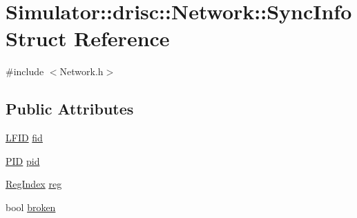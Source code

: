 \hypertarget{struct_simulator_1_1drisc_1_1_network_1_1_sync_info}{\section{Simulator\+:\+:drisc\+:\+:Network\+:\+:Sync\+Info Struct Reference}
\label{struct_simulator_1_1drisc_1_1_network_1_1_sync_info}
}


{\ttfamily \#include $<$Network.\+h$>$}

\subsection*{Public Attributes}
\begin{DoxyCompactItemize}
\item 
\hyperlink{namespace_simulator_aaccbc706b2d6c99085f52f6dfc2333e4}{L\+F\+I\+D} \hyperlink{struct_simulator_1_1drisc_1_1_network_1_1_sync_info_ab358f670dbf52acb1ebe12c67c1fda1c}{fid}
\item 
\hyperlink{namespace_simulator_aa671021151c047ae2da6dce4e6303476}{P\+I\+D} \hyperlink{struct_simulator_1_1drisc_1_1_network_1_1_sync_info_a11efa6640ab7c49d56d52db68dc643ec}{pid}
\item 
\hyperlink{namespace_simulator_ab00c9033de4c9a17db7b53d6c292515c}{Reg\+Index} \hyperlink{struct_simulator_1_1drisc_1_1_network_1_1_sync_info_ae59081346f93289bf7a012e739100c56}{reg}
\item 
bool \hyperlink{struct_simulator_1_1drisc_1_1_network_1_1_sync_info_a81ddd6ff32745fa9b625a03132b3518d}{broken}
\end{DoxyCompactItemize}



